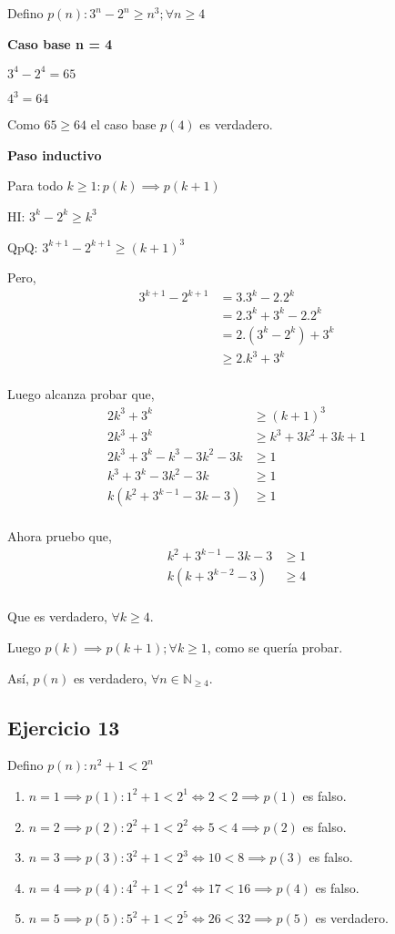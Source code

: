 Defino $ p(n): 3^n - 2^n \geq n^3; \forall n \geq 4 $

\textbf{Caso base n = 4}

$3^4 - 2^4 = 65$

$ 4^3 = 64$

Como $ 65 \geq 64 $ el caso base $p(4)$ es verdadero.

\textbf{Paso inductivo}

Para todo $k \geq 1: p(k) \implies p(k+1)$

HI: $3^k - 2^k \geq k^3$

QpQ: $ 3^{k+1} - 2^{k+1} \geq (k+1)^3$

Pero,
\begin{align*}
    3^{k+1} - 2^{k+1} &= 3.3^k - 2.2^k \\
    &= 2.3^k + 3^k - 2.2^k \\
    &= 2.(3^k - 2^k) + 3^k \\
    &\geq 2.k^3 + 3^k \\
\end{align*}

Luego alcanza probar que,
\begin{align*}
    2k^3 + 3^k &\geq (k+1)^3 \\
    2k^3 + 3^k &\geq k^3 + 3k^2 + 3k + 1 \\
    2k^3 + 3^k - k^3 - 3k^2 - 3k &\geq 1 \\
    k^3 + 3^k - 3k^2 - 3k &\geq 1 \\
    k(k^2 + 3^{k-1} - 3k -3) &\geq 1 \\
\end{align*}

Ahora pruebo que,
\begin{align*}
    k^2 + 3^{k-1} - 3k -3 &\geq 1 \\
    k(k + 3^{k-2} - 3) &\geq 4 \\
\end{align*}

Que es verdadero, $\forall k \geq 4$.

Luego $p(k) \implies p(k+1); \forall k \geq 1$, como se quería probar.

Así, $p(n)$ es verdadero, $\forall n \in \mathbb{N}_{\geq 4}$.

\subsection{Ejercicio 13}

Defino $ p(n): n^2 +1 < 2^n$

\begin{enumerate}
    \item[] $ n= 1 \implies p(1): 1^2 + 1<2^1 \iff 2<2 \implies p(1)$ es falso.
    \item[] $ n= 2 \implies p(2): 2^2 + 1<2^2 \iff 5<4 \implies p(2)$ es falso.  
    \item[] $ n= 3 \implies p(3): 3^2 + 1<2^3 \iff 10<8 \implies p(3)$ es falso.
    \item[] $ n= 4 \implies p(4): 4^2 + 1<2^4 \iff 17<16 \implies p(4)$ es falso. 
    \item[] $ n= 5 \implies p(5): 5^2 + 1<2^5 \iff 26<32 \implies p(5)$ es verdadero. 
\end{enumerate}

